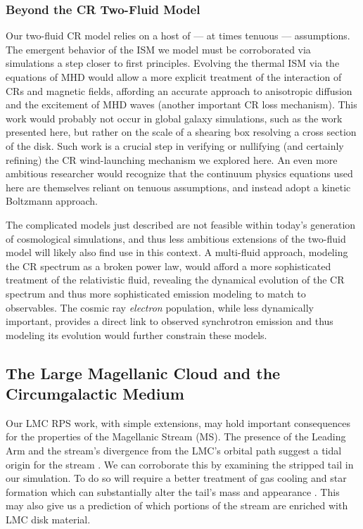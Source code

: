 \subsubsection{Beyond the CR Two-Fluid Model}
\label{sec:beyond-two-fluid}
Our two-fluid CR model relies on a host of --- at times tenuous --- assumptions. The emergent behavior of the ISM we model must be corroborated via simulations a step closer to first principles. Evolving the thermal ISM via the equations of MHD would allow a more explicit treatment of the interaction of CRs and magnetic fields, affording an accurate approach to anisotropic diffusion and the excitement of MHD waves (another important CR loss mechanism). This work would probably not occur in global galaxy simulations, such as the work presented here, but rather on the scale of a shearing box resolving a cross section of the disk. Such work is a crucial step in verifying or nullifying (and certainly refining) the CR wind-launching mechanism we explored here. An even more ambitious researcher would recognize that the continuum physics equations used here are themselves reliant on tenuous assumptions, and instead adopt a kinetic Boltzmann approach.

The complicated models just described are not feasible within today's generation of cosmological simulations, and thus less ambitious extensions of the two-fluid model will likely also find use in this context. A multi-fluid approach, modeling the CR spectrum as a broken power law, would afford a more sophisticated treatment of the relativistic fluid, revealing the dynamical evolution of the CR spectrum and thus more sophisticated emission modeling to match to observables. The cosmic ray \emph{electron} population, while less dynamically important, provides a direct link to observed synchrotron emission and thus modeling its evolution would further constrain these models.

\subsection{The Large Magellanic Cloud and the Circumgalactic Medium}
\label{sec:lmc-rps-future}

Our LMC RPS work, with simple extensions, may hold important consequences for the properties of the Magellanic Stream (MS). The presence of the Leading Arm \citep{Putman2003} and the stream's divergence from the LMC's orbital path suggest a tidal origin for the stream \citep{Besla2012}. We can corroborate this by examining the stripped tail in our simulation. To do so will require a better treatment of gas cooling and star formation which can substantially alter the tail's mass and appearance \citep{Tonnesen2009,Tonnesen2012}. This may also give us a prediction of which portions of the stream are enriched with LMC disk material. 

